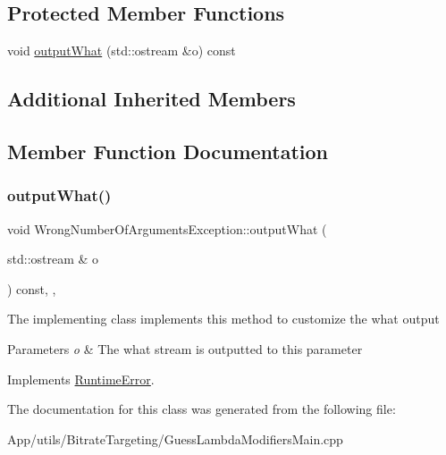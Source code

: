 \subsection*{Protected Member Functions}
\begin{DoxyCompactItemize}
\item 
void \hyperlink{class_wrong_number_of_arguments_exception_aea3df412ea5cb97aa284b258021532c2}{output\+What} (std\+::ostream \&o) const
\end{DoxyCompactItemize}
\subsection*{Additional Inherited Members}


\subsection{Member Function Documentation}
\mbox{\label{class_wrong_number_of_arguments_exception_aea3df412ea5cb97aa284b258021532c2}} 
\subsubsection{\texorpdfstring{output\+What()}{outputWhat()}}
{\footnotesize\ttfamily void Wrong\+Number\+Of\+Arguments\+Exception\+::output\+What (\begin{DoxyParamCaption}\item[{std\+::ostream \&}]{o }\end{DoxyParamCaption}) const\hspace{0.3cm}{\ttfamily [inline]}, {\ttfamily [protected]}, {\ttfamily [virtual]}}

The implementing class implements this method to customize the what output 
\begin{DoxyParams}{Parameters}
{\em o} & The what stream is outputted to this parameter \\
\hline
\end{DoxyParams}


Implements \hyperlink{class_runtime_error_a5020b04a2a7fac8b1dbfbfe4a30055b0}{Runtime\+Error}.



The documentation for this class was generated from the following file\+:\begin{DoxyCompactItemize}
\item 
App/utils/\+Bitrate\+Targeting/Guess\+Lambda\+Modifiers\+Main.\+cpp\end{DoxyCompactItemize}
